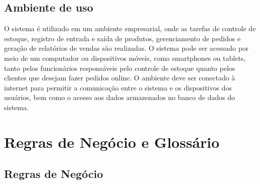\documentclass[
	12pt,				%
	openright,			%
	twoside,			%
	a4paper,			%
	english,			%
	brazil				%
	]{abntex2}
\begin{document}
\section{Ambiente de uso}\label{ambientes_de_uso}

O sistema é utilizado em um ambiente empresarial, onde as tarefas de controle de estoque, registro de entrada e saída de produtos, gerenciamento de pedidos e geração de relatórios de vendas são realizadas. O sistema pode ser acessado por meio de um computador ou dispositivos móveis, como smartphones ou tablets, tanto pelos funcionários responsáveis pelo controle de estoque quanto pelos clientes que desejam fazer pedidos online. O ambiente deve ser conectado à internet para permitir a comunicação entre o sistema e os dispositivos dos usuários, bem como o acesso aos dados armazenados no banco de dados do sistema.

\chapter{Regras de Negócio e Glossário}\label{regras_de_negocio_e_glossario}

\section{Regras de Negócio}\label{regras_de_negocio}
\end{document}
